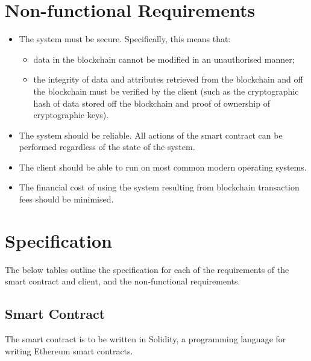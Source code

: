 \documentclass[12pt]{report}
\begin{document}
	\section{Non-functional Requirements}
	\begin{itemize}
		\item The system must be secure. Specifically, this means that:
			\begin{itemize}
				\item data in the blockchain cannot be modified in an unauthorised manner;
				\item the integrity of data and attributes retrieved from the blockchain and off the blockchain must be verified by the client (such as the cryptographic hash of data stored off the blockchain and proof of ownership of cryptographic keys).
			\end{itemize}
		\item The system should be reliable. All actions of the smart contract can be performed regardless of the state of the system.
		\item The client should be able to run on most common modern operating systems.
		\item The financial cost of using the system resulting from blockchain transaction fees should be minimised.
	\end{itemize}
	
	\section{Specification}
	The below tables outline the specification for each of the requirements of the smart contract and client, and the non-functional requirements.	
	
	\subsection{Smart Contract}
	The smart contract is to be written in Solidity, a programming language for writing Ethereum smart contracts.
	
\end{document}
